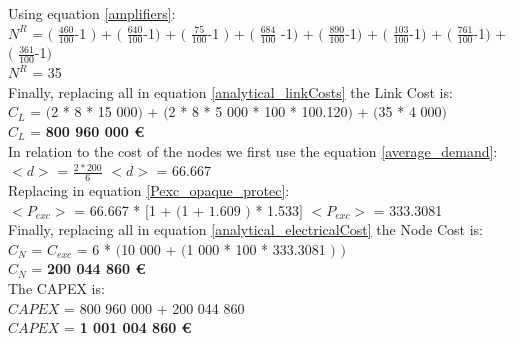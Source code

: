 Using equation \ref{amplifiers}:\\

$N^R$ = $($ $\frac{460}{100}$-1 $)$ + $($ $\frac{640}{100}$-1$)$ + $($ $\frac{75}{100}$-1 $)$ + $($ $\frac{684}{100}$ -1$)$ + $($ $\frac{890}{100}$-1$)$ + $($ $\frac{103}{100}$-1$)$ + $($ $\frac{761}{100}$-1$)$ + $($ $\frac{361}{100}$-1$)$\\

$N^R$ = 35\\

Finally, replacing all in equation \ref{analytical_linkCosts} the Link Cost is:\\

$C_L$ = $($2 * 8 * 15 000$)$ + $($2 * 8 * 5 000 * 100 * 100.120$)$ + $($35 * 4 000$)$\\

$C_L$ = \textbf{800 960 000 \euro}\\

In relation to the cost of the nodes we first use the equation \ref{average_demand}:\\

$<d>$ = $\frac{2 * 200}{6}$ \qquad \qquad $<d>$ = 66.667\\

Replacing in equation \ref{Pexc_opaque_protec}:\\

$<P_{exc}>$ = 66.667 * $[$1 + $($1 + $1.609$ $)$ * 1.533$]$ \qquad \quad $<P_{exc}>$ = 333.3081 \\

Finally, replacing all in equation \ref{analytical_electricalCost} the Node Cost is:\\

$C_N$ = $C_{exc}$ = 6 * $($10 000 + $($1 000 * 100 * 333.3081 $)$ $)$\\

$C_N$ = \textbf{200 044 860 \euro}\\

The CAPEX is:\\
$CAPEX$ = 800 960 000 + 200 044 860\\

$CAPEX$ = \textbf{1 001 004 860 \euro}\\

